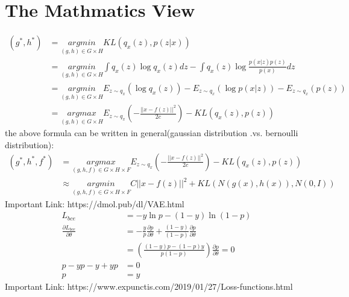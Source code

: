 \documentclass{article}
\begin{document}
\section{The Mathmatics View}
\begin{equation}
    \begin{split}
    (g^*,h^*) &=\underset{(g,h)\in G\times H}{argmin} KL(q_{x}(z),p(z|x)) \\
    &=\underset{(g,h)\in G\times H}{argmin} \int q_{x}(z)\log q_{x}(z) dz-\int q_{x}(z)\log \frac{p(x|z)p(z)}{p(x)}dz \\
    &=\underset{(g,h)\in G\times H}{argmin} E_{z\sim q_{x}}(\log q_{x}(z)) - E_{z\sim q_{x}}(\log p(x|z))-E_{z\sim q_{x}}(p(z))\\
    &=\underset{(g,h)\in G\times H}{argmax} E_{z\sim q_{x}}(-\frac{||x-f(z)||^{2}}{2c})-KL(q_{x}(z),p(z))
    \end{split}
\end{equation}
the above formula can be written in general(gaussian distribution .vs. bernoulli distribution):
\begin{equation}
\begin{split}
(g^*,h^*,f^*)&=\underset{(g,h,f)\in G\times H \times F}{argmax} E_{z\sim q_{x}}(-\frac{||x-f(z)||^{2}}{2c})-KL(q_{x}(z),p(z))\\
    &\approx \underset{(g,h,f)\in G\times H \times F}{argmin} C||x-f(z)||^{2}+KL(N(g(x),h(x)),N(0,I))
\end{split}
\end{equation}
Important Link:
https://dmol.pub/dl/VAE.html
\begin{equation}
\begin{split}
L_{bce} &=-y\ln p-(1-y)\ln (1-p) \\
\frac{\partial L_{bce}}{\partial \theta} &=-\frac{y}{p}\frac{\partial p}{\partial \theta}+\frac{(1-y)}{(1-p)}\frac{\partial p}{\partial \theta} \\
&=(\frac{(1-y)p-(1-p)y}{p(1-p)})\frac{\partial p}{\partial \theta}=0 \\
p-yp-y+yp&=0 \\
p&=y
\end{split}
\end{equation}
Important Link:
https://www.expunctis.com/2019/01/27/Loss-functions.html
\end{document}
